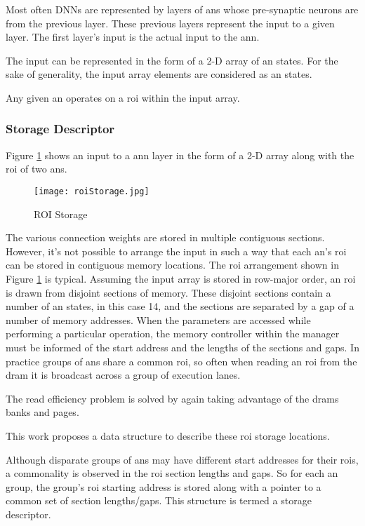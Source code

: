 Most often DNNs are represented by layers of \acp{an} whose pre-synaptic neurons are from the previous layer. These previous layers represent the input to a given layer. The first layer's input is the actual input to the \ac{ann}.

The input can be represented in the form of a 2-D array of \ac{an} states. For the sake of generality, the input array elements are considered as \ac{an} states.

Any given \ac{an} operates on a \ac{roi} within the input array.

\subsubsection{Storage Descriptor}
\label{sec:Storage Descriptor}

Figure \ref{fig:roiStorage} shows an input to a \ac{ann} layer in the form of a 2-D array along with the \ac{roi} of two \acp{an}.

\begin{figure}[!t]
\centering
\captionsetup{justification=centering}
\captionsetup{width=.9\linewidth}
\centerline{
\mbox{\texttt{[image: roiStorage.jpg]}}
}
\caption{ROI Storage}
\label{fig:roiStorage}
\end{figure}

The various connection weights are stored in multiple contiguous sections. However, it's not possible to arrange the input in such a way that each \ac{an}'s \ac{roi} can be stored in contiguous memory locations. 
The \ac{roi} arrangement shown in Figure \ref{fig:roiStorage} is typical. Assuming the input array is stored in row-major order, an \ac{roi} is drawn from disjoint sections of memory. 
These disjoint sections contain a number of \ac{an} states, in this case 14, and the sections are separated by a gap of a number of memory addresses. 
When the parameters are accessed while performing a particular operation, the memory controller within the manager must be informed of the start address and the lengths of the sections and gaps. 
In practice groups of \acp{an} share a common \ac{roi}, so often when reading an \ac{roi} from the \ac{dram} it is broadcast across a group of execution lanes.

The read efficiency problem is solved by again taking advantage of the \ac{dram}s banks and pages.

This work proposes a data structure to describe these \ac{roi} storage locations.

Although disparate groups of \acp{an} may have different start addresses for their \acp{roi}, a commonality is observed in the \ac{roi} section lengths and gaps. So for each \ac{an} group, the group's \ac{roi} starting address is stored along with a pointer to a common set of section lengths/gaps. This structure is termed a storage descriptor.

